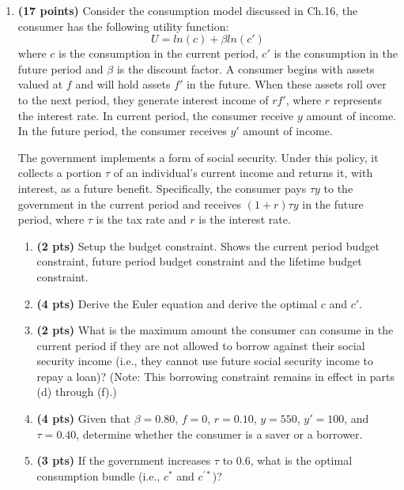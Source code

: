 \documentclass[14pt, oneside]{memoir}
\begin{document}
{{{\begin{enumerate}[label=\textbf{\arabic*.}, itemsep=15pt]
\item \textbf{(17 points)}   Consider the consumption model discussed in Ch.16, the consumer has the following utility function:
\[U = ln(c) + \beta ln(c')\]
where $c$ is the consumption in the current period, $c'$ is the consumption in the future period and $\beta$ is the discount factor. A consumer begins with assets valued at \(f\) and will hold assets \(f'\) in the future. When these assets roll over to the next period, they generate interest income of \(rf'\), where \(r\) represents the interest rate. In current period, the consumer receive $y$ amount of income. In the future period, the consumer receives $y'$ amount of income. 

The government implements a form of social security. Under this policy, it collects a portion $\tau$ of an individual's current income and returns it, with interest, as a future benefit. Specifically, the consumer pays $\tau y$ to the government in the current period and receives $(1 + r)\tau y$ in the future period, where $\tau$ is the tax rate and $r$ is the interest rate. 
\begin{enumerate}[label=(\alph*)]
	\item \textbf{(2 pts)} 	Setup the budget constraint. Shows the current period budget constraint, future period budget constraint and the lifetime budget constraint.
		
	
	\item \textbf{(4 pts)}  Derive the Euler equation and derive the optimal $c$ and $c'$.
	
	\item \textbf{(2 pts)} What is the maximum amount the consumer can consume in the current period if they are not allowed to borrow against their social security income (i.e., they cannot use future social security income to repay a loan)? (Note: This borrowing constraint remains in effect in parts (d) through (f).)
	
	
	\item \textbf{(4 pts)} Given that \(\beta = 0.80\), \(f = 0\), \(r = 0.10\), \(y = 550\), \(y' = 100\), and \(\tau = 0.40\), determine whether the consumer is a saver or a borrower.
	
	
	\item \textbf{(3 pts)} If the government increases \(\tau\) to 0.6, what is the optimal consumption bundle (i.e., \(c^*\) and \(c^{\prime*}\))?
	

\end{enumerate}
\end{enumerate}}}}
\end{document}
